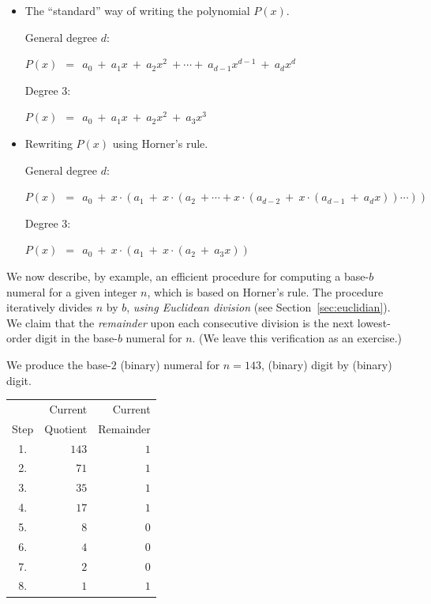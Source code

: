 \begin{itemize}
\item {\small\sf The ``standard'' way of writing the polynomial $P(x)$.}

\noindent General degree $d$:

$P(x) \ \ = \ \ a_0 \ + \ a_1 x \ + \ a_2 x^2 \ + \cdots + \ a_{d-1} x^{d-1} \ + \ a_d x^d$

\noindent Degree $3$:

$P(x) \ \ = \ \ a_0 \ + \ a_1 x \ + \ a_2 x^2 \ + \ a_3 x^3$

\medskip\item {\small\sf Rewriting $P(x)$ using Horner's rule.}

\noindent General degree $d$:

$P(x) \ \ = \ \ a_0 \ + \ x \cdot (a_1 \ + \ x \cdot (a_2  \ +  \cdots + x \cdot (a_{d-2} \ + \ x \cdot (a_{d-1} \ + \ a_d x)) \cdots ))$  

\noindent Degree $3$:

$P(x) \ \ = \ \ a_0 \ + \ x \cdot (a_1 \ + \ x \cdot (a_2  \ + \ a_3 x))$ 
\end{itemize}

\bigskip

\noindent
We now describe, by example, an efficient procedure for computing a base-$b$ numeral for a given integer $n$, which is based on Horner's rule.  The procedure iteratively divides $n$ by $b$, {\em using Euclidean division} (see Section~\ref{sec:euclidian}).  We claim that the {\em remainder} upon each consecutive division is the next lowest-order digit in the base-$b$ numeral for $n$.  (We leave this verification as an exercise.)

\bigskip

We produce the base-$2$ (binary) numeral for $n = 143$, (binary) digit by (binary) digit.

\bigskip

\hspace*{.35in}
\begin{tabular}{|c|r|r|}
\hline
         & Current  & Current \\
Step & Quotient & Remainder \\
\hline
1. & $143$ & $1$ \\
2. & $71$  & $1$ \\
3. & $35$  & $1$ \\
4. & $17$  & $1$ \\
5. & $8$   & $0$ \\
6. & $4$   & $0$ \\
7. & $2$   & $0$ \\
8. & $1$   & $1$ \\
\hline
\end{tabular}

